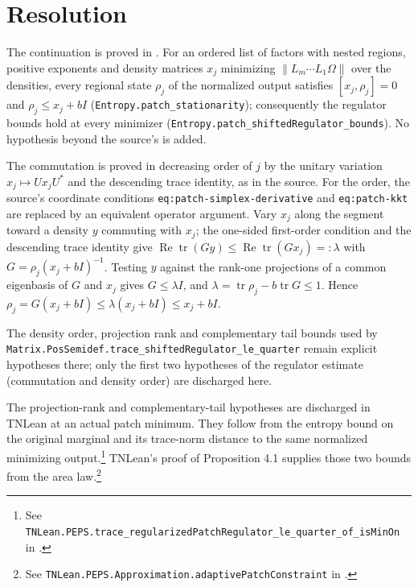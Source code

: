 \documentclass{article}
\begin{document}
\section{Resolution}
The continuation is proved in .
For an ordered list of factors with nested regions, positive exponents and
density matrices $x_j$ minimizing $\|L_m\cdots L_1\Omega\|$ over the
densities, every regional state $\rho_j$ of the normalized output satisfies
$[x_j,\rho_j]=0$ and $\rho_j\le x_j+bI$ (\texttt{Entropy.patch\_stationarity});
consequently the regulator bounds hold at every minimizer
(\texttt{Entropy.patch\_shiftedRegulator\_bounds}).
No hypothesis beyond the source's is added.

The commutation is proved in decreasing order of $j$ by the unitary variation
$x_j\mapsto Ux_jU^*$ and the descending trace identity, as in the source.
For the order, the source's coordinate conditions
\texttt{eq:patch-simplex-derivative} and \texttt{eq:patch-kkt} are replaced by
an equivalent operator argument. Vary $x_j$ along the segment toward a density
$y$ commuting with $x_j$; the one-sided first-order condition and the
descending trace identity give
$\operatorname{Re}\operatorname{tr}(Gy)\le\operatorname{Re}\operatorname{tr}(Gx_j)=:\lambda$
with $G=\rho_j(x_j+bI)^{-1}$. Testing $y$ against the rank-one projections of a
common eigenbasis of $G$ and $x_j$ gives $G\le\lambda I$, and
$\lambda=\operatorname{tr}\rho_j-b\operatorname{tr}G\le1$. Hence
$\rho_j=G(x_j+bI)\le\lambda(x_j+bI)\le x_j+bI$.

The density order, projection rank and complementary tail bounds used by
\texttt{Matrix.PosSemidef.trace\_shiftedRegulator\_le\_quarter} remain
explicit hypotheses there; only the first two hypotheses of the regulator
estimate (commutation and density order) are discharged here.

The projection-rank and complementary-tail hypotheses are discharged in
TNLean at an actual patch minimum. They follow from the entropy bound on
the original marginal and its trace-norm distance to the same normalized
minimizing output.\footnote{See
\texttt{TNLean.PEPS.trace\_regularizedPatchRegulator\_le\_quarter\_of\_isMinOn} in
\href{https://github.com/LionSR/TNLean/blob/442d18ba754ece8b979097f534316fc0ca52e661/TNLean/PEPS/AreaLaw/RegularizedPatchActualRegulatorTrace.lean\#L72}{}.}
TNLean's proof of Proposition 4.1 supplies those two bounds from the area
law.\footnote{See
\texttt{TNLean.PEPS.Approximation.adaptivePatchConstraint} in
\href{https://github.com/LionSR/TNLean/blob/442d18ba754ece8b979097f534316fc0ca52e661/TNLean/PEPS/Approximation/PolynomialPEPSTheorem.lean\#L45-L46}{}.}
\end{document}
